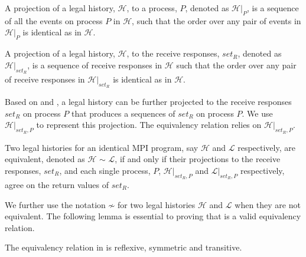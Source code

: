 \begin{definition}\label{def:projection_process}
A projection of a legal history, $\mathcal{H}$, to a process, $P$, denoted as $\mathcal{H} | _P$, is a sequence of all the events on process $P$ in $\mathcal{H}$, such that the order over any pair of events in $\mathcal{H} | _P$ is identical as in $\mathcal{H}$.
\end{definition}

\begin{definition}\label{def:projection_receive}
A projection of a legal history, $\mathcal{H}$, to the receive responses, $\mathit{set_R}$, denoted as $\mathcal{H} | _\mathit{set_R}$, is a sequence of receive responses in $\mathcal{H}$ such that the order over any pair of receive responses in $\mathcal{H} | _\mathit{set_R}$ is identical as in $\mathcal{H}$.
\end{definition}

Based on  and , a legal history can be further projected to the receive responses $\mathit{set_R}$ on process $P$ that produces a sequences of $\mathit{set_R}$ on process $P$. We use $\mathcal{H} | _{\mathit{set_R},P}$ to represent this projection. The equivalency relation relies on $\mathcal{H} | _{\mathit{set_R},P}$.

\begin{definition}\label{def:er}
Two legal histories for an identical MPI program, say $\mathcal{H}$ and $\mathcal{L}$ respectively, are equivalent, denoted as $\mathcal{H}$ $\sim$ $\mathcal{L}$, if and only if their projections to the receive responses, $\mathit{set_R}$, and each single process, $P$, $\mathcal{H} | _{\mathit{set_R},P}$ and $\mathcal{L} | _{\mathit{set_R},P}$ respectively, agree on the return values of $\mathit{set_R}$.
\end{definition}

We further use the notation $\not\sim$ for two legal histories $\mathcal{H}$ and $\mathcal{L}$ when they are not equivalent. The following lemma is essential to proving that  is a valid equivalency relation.

\begin{lemma}\label{lemma:rst}
The equivalency relation in  is reflexive, symmetric and transitive.
\end{lemma}

